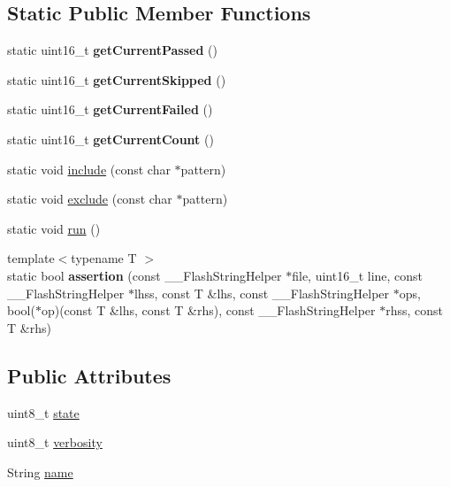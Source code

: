 \subsection*{Static Public Member Functions}
\begin{DoxyCompactItemize}
\item 
\hypertarget{class_test_aa574522e4def0269d267ab423d3b2bac}{static uint16\-\_\-t {\bfseries get\-Current\-Passed} ()}\label{class_test_aa574522e4def0269d267ab423d3b2bac}

\item 
\hypertarget{class_test_a09902ca8e63d22eb5a11ee77f9e0c6cd}{static uint16\-\_\-t {\bfseries get\-Current\-Skipped} ()}\label{class_test_a09902ca8e63d22eb5a11ee77f9e0c6cd}

\item 
\hypertarget{class_test_a82b377c7362903b35c4aa0fd050ed4b0}{static uint16\-\_\-t {\bfseries get\-Current\-Failed} ()}\label{class_test_a82b377c7362903b35c4aa0fd050ed4b0}

\item 
\hypertarget{class_test_a54c039a164c1c1d97cd73e96bf533e01}{static uint16\-\_\-t {\bfseries get\-Current\-Count} ()}\label{class_test_a54c039a164c1c1d97cd73e96bf533e01}

\item 
static void \hyperlink{class_test_acfe763aab53dbecab02f473b93536347}{include} (const char $\ast$pattern)
\item 
static void \hyperlink{class_test_a00269bd7c55b1c93477be06174280b04}{exclude} (const char $\ast$pattern)
\item 
static void \hyperlink{class_test_abb64a8b970de8b2422b9f56cd8719ca4}{run} ()
\item 
\hypertarget{class_test_a8a1421a6386ce6b80e34b57b370576a4}{{\footnotesize template$<$typename T $>$ }\\static bool {\bfseries assertion} (const \-\_\-\-\_\-\-Flash\-String\-Helper $\ast$file, uint16\-\_\-t line, const \-\_\-\-\_\-\-Flash\-String\-Helper $\ast$lhss, const T \&lhs, const \-\_\-\-\_\-\-Flash\-String\-Helper $\ast$ops, bool($\ast$op)(const T \&lhs, const T \&rhs), const \-\_\-\-\_\-\-Flash\-String\-Helper $\ast$rhss, const T \&rhs)}\label{class_test_a8a1421a6386ce6b80e34b57b370576a4}

\end{DoxyCompactItemize}
\subsection*{Public Attributes}
\begin{DoxyCompactItemize}
\item 
uint8\-\_\-t \hyperlink{class_test_a208f71a142dbf9a369cb0f345bc924dc}{state}
\item 
uint8\-\_\-t \hyperlink{class_test_aa0489f064ae55a20229646a584110a39}{verbosity}
\item 
String \hyperlink{class_test_acff24a84a14b606d01913a4a701ca821}{name}
\end{DoxyCompactItemize}
